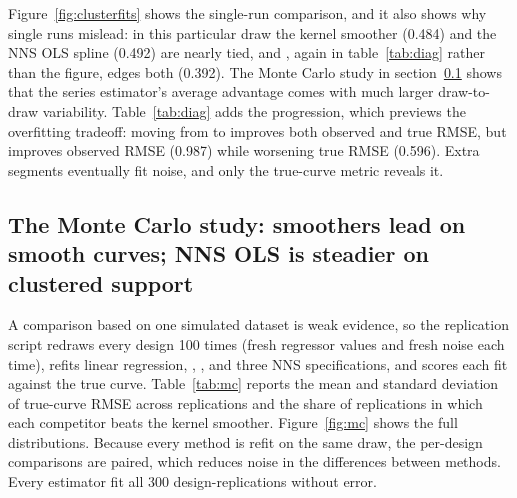 \documentclass[bib]{statapress}
\begin{document}
Figure~\ref{fig:clusterfits} shows the single-run comparison, and it also
shows why single runs mislead: in this particular draw the kernel smoother
(0.484) and the NNS OLS spline (0.492) are nearly tied, and , again in table~\ref{tab:diag} rather than the figure, edges both
(0.392).  The Monte Carlo study in section~\ref{sec:mc}
shows that the series estimator's average advantage comes with much larger
draw-to-draw variability.  Table~\ref{tab:diag} adds the 
progression, which previews the overfitting tradeoff: moving from
 to  improves both observed and true RMSE, but
 improves observed RMSE (0.987) while worsening true RMSE
(0.596).  Extra segments eventually fit noise, and only the true-curve metric
reveals it.

\subsection{The Monte Carlo study: smoothers lead on smooth curves; NNS OLS is steadier on clustered support}
\label{sec:mc}

A comparison based on one simulated dataset is weak evidence, so the
replication script redraws every design 100 times (fresh regressor values and
fresh noise each time), refits linear regression, ,
, and three NNS specifications, and scores each fit
against the true curve.  Table~\ref{tab:mc}
reports the mean and standard deviation of true-curve RMSE across replications
and the share of replications in which each competitor beats the kernel
smoother.  Figure~\ref{fig:mc} shows the full distributions.  Because every
method is refit on the same draw, the per-design comparisons are paired, which
reduces noise in the differences between methods.  Every estimator fit all
300 design-replications without error.
\end{document}
